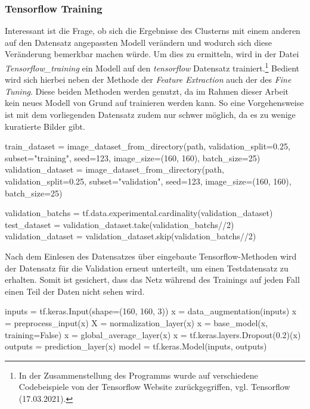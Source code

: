 \documentclass[a4paper,12pt,ngerman]{article}
\begin{document}
\subsubsection{Tensorflow Training}

Interessant ist die Frage, ob sich die Ergebnisse des Clusterns mit einem anderen auf den Datensatz angepassten Modell verändern und wodurch sich diese Veränderung bemerkbar machen würde. Um dies zu ermitteln, wird in der Datei \textit{Tensorflow\_training} ein Modell auf den \textit{tensorflow} Datensatz trainiert.\footnote{In der Zusammenstellung des Programms wurde auf verschiedene Codebeispiele von der Tensorflow Website zurückgegriffen, vgl. Tensorflow (17.03.2021).} Bedient wird sich hierbei neben der Methode der \textit{Feature Extraction} auch der des \textit{Fine Tuning}. Diese beiden Methoden werden genutzt, da im Rahmen dieser Arbeit kein neues Modell von Grund auf trainieren werden kann. So eine Vorgehensweise ist mit dem vorliegenden Datensatz zudem nur schwer möglich, da es zu wenige kuratierte Bilder gibt. \\

\begin{python}
	train_dataset = image_dataset_from_directory(path, validation_split=0.25, subset="training", seed=123, image_size=(160, 160), batch_size=25)
	validation_dataset = image_dataset_from_directory(path, validation_split=0.25, subset="validation", seed=123, image_size=(160, 160), batch_size=25)

	validation_batchs = tf.data.experimental.cardinality(validation_dataset)
	test_dataset = validation_dataset.take(validation_batchs//2)
	validation_dataset = validation_dataset.skip(validation_batchs//2)
\end{python}

Nach dem Einlesen des Datensatzes über eingebaute Tensorflow-Methoden wird der Datensatz für die Validation erneut unterteilt, um einen Testdatensatz zu erhalten. Somit ist gesichert, dass das Netz während des Trainings auf jeden Fall einen Teil der Daten nicht sehen wird. \\

\begin{python}
	inputs = tf.keras.Input(shape=(160, 160, 3))
	x = data_augmentation(inputs)
	x = preprocess_input(x)
	X = normalization_layer(x)
	x = base_model(x, training=False)
	x = global_average_layer(x)
	x = tf.keras.layers.Dropout(0.2)(x)
	outputs = prediction_layer(x)
	model = tf.keras.Model(inputs, outputs)
\end{python}
\end{document}
